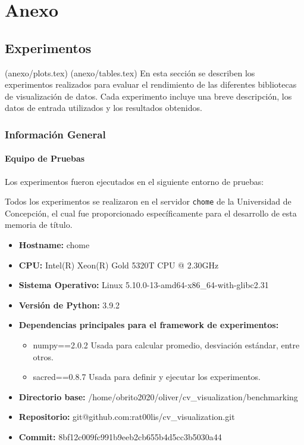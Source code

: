 \section{Anexo}

\subsection{Experimentos}
\label{sec:experimentos}
(anexo/plots.tex)
(anexo/tables.tex)
En esta sección se describen los experimentos realizados para evaluar el rendimiento de las diferentes bibliotecas de visualización de datos. Cada experimento incluye una breve descripción, los datos de entrada utilizados y los resultados obtenidos.

\subsubsection{Información General}
\label{general_info}

\paragraph{Equipo de Pruebas}
Los experimentos fueron ejecutados en el siguiente entorno de pruebas:

Todos los experimentos se realizaron en el servidor \texttt{chome} de la Universidad de Concepción, el cual fue proporcionado específicamente para el desarrollo de esta memoria de título. 

\begin{itemize}
    \item \textbf{Hostname:} chome
    \item \textbf{CPU:} Intel(R) Xeon(R) Gold 5320T CPU @ 2.30GHz
    \item \textbf{Sistema Operativo:} Linux 5.10.0-13-amd64-x86\_64-with-glibc2.31
    \item \textbf{Versión de Python:} 3.9.2
    \item \textbf{Dependencias principales para el framework de experimentos:}
    \begin{itemize}
        \item numpy==2.0.2
            Usada para calcular promedio, desviación estándar, entre otros.
        \item sacred==0.8.7
            Usada para definir y ejecutar los experimentos.
    \end{itemize}
    \item \textbf{Directorio base:} /home/obrito2020/oliver/cv\_visualization/benchmarking
    \item \textbf{Repositorio:} git@github.com:rat00lis/cv\_visualization.git
    \item \textbf{Commit:} 8bf12c009fc991b9eeb2cb655b4d5cc3b5030a44
\end{itemize}


